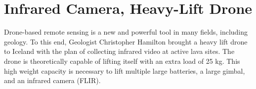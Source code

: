 \section{Infrared Camera, Heavy-Lift Drone}
\label{section:ir_drone}

Drone-based remote sensing is a new and powerful tool in many fields, including geology.
To this end, Geologist Christopher Hamilton brought a heavy lift drone to Iceland
with the plan of collecting infrared video at active lava sites.
The drone is theoretically capable of lifting itself with an extra load of 25 kg.
This high weight capacity is necessary to lift multiple large batteries,
a large gimbal,
and an infrared camera (FLIR).
